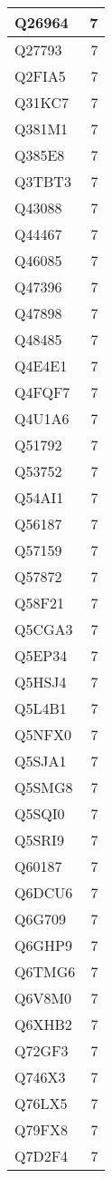 \documentclass[
]{book}
\theoremstyle{definition}
\theoremstyle{definition}
\theoremstyle{definition}
\theoremstyle{definition}
\theoremstyle{remark}
\begin{document}
\begin{table}
\begin{tabular}{l|r}
\hline
Q26964 & 7\\
\hline
Q27793 & 7\\
\hline
Q2FIA5 & 7\\
\hline
Q31KC7 & 7\\
\hline
Q381M1 & 7\\
\hline
Q385E8 & 7\\
\hline
Q3TBT3 & 7\\
\hline
Q43088 & 7\\
\hline
Q44467 & 7\\
\hline
Q46085 & 7\\
\hline
Q47396 & 7\\
\hline
Q47898 & 7\\
\hline
Q48485 & 7\\
\hline
Q4E4E1 & 7\\
\hline
Q4FQF7 & 7\\
\hline
Q4U1A6 & 7\\
\hline
Q51792 & 7\\
\hline
Q53752 & 7\\
\hline
Q54AI1 & 7\\
\hline
Q56187 & 7\\
\hline
Q57159 & 7\\
\hline
Q57872 & 7\\
\hline
Q58F21 & 7\\
\hline
Q5CGA3 & 7\\
\hline
Q5EP34 & 7\\
\hline
Q5HSJ4 & 7\\
\hline
Q5L4B1 & 7\\
\hline
Q5NFX0 & 7\\
\hline
Q5SJA1 & 7\\
\hline
Q5SMG8 & 7\\
\hline
Q5SQI0 & 7\\
\hline
Q5SRI9 & 7\\
\hline
Q60187 & 7\\
\hline
Q6DCU6 & 7\\
\hline
Q6G709 & 7\\
\hline
Q6GHP9 & 7\\
\hline
Q6TMG6 & 7\\
\hline
Q6V8M0 & 7\\
\hline
Q6XHB2 & 7\\
\hline
Q72GF3 & 7\\
\hline
Q746X3 & 7\\
\hline
Q76LX5 & 7\\
\hline
Q79FX8 & 7\\
\hline
Q7D2F4 & 7\\

\end{tabular}
\end{table}
\end{document}
